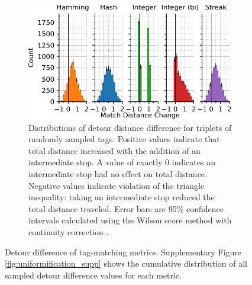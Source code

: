 \begin{figure}
\begin{center}
\begin{minipage}{\linewidth}
\begin{subfigure}[b]{\linewidth}
\includegraphics[width=\linewidth]{img/detour_difference/bitweight=0dot5+seed=1+title=low-triplet-analysis+_data_hathash_hash=6b0749ef97a58721+_script_fullcat_hash=72e937b6fbc3079c+ext=}
\caption{
Distributions of detour distance difference for triplets of randomly sampled tags.
Positive values indicate that total distance increased with the addition of an intermediate stop.
A value of exactly 0 indicates an intermediate stop had no effect on total distance.
Negative values indicate violation of the triangle inequality: taking an intermediate stop reduced the total distance traveled.
Error bars are 95\% confidence intervals calculated using the Wilson score method with continuity correction \citep{newcombe1998two}.
} \label{fig:detour_difference_distribution}

\end{subfigure}
\end{minipage}

\caption{
Detour difference of tag-matching metrics.
Supplementary Figure \ref{fig:uniformification_supp} shows the cumulative distribution of all sampled detour difference values for each metric.
}
\label{fig:detour_difference}

\end{center}
\end{figure}
